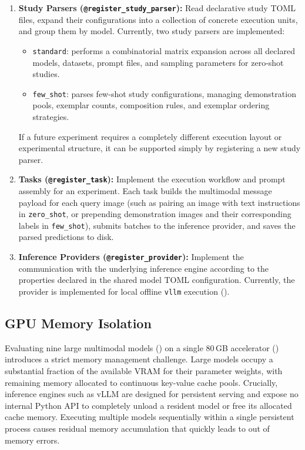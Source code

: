 \begin{enumerate}
    \item \textbf{Study Parsers (\texttt{@register\_study\_parser}):} Read declarative study TOML files, expand their configurations into a collection of concrete execution units, and group them by model. Currently, two study parsers are implemented:
    \begin{itemize}
        \item \texttt{standard}: performs a combinatorial matrix expansion across all declared models, datasets, prompt files, and sampling parameters for zero-shot studies.
        \item \texttt{few\_shot}: parses few-shot study configurations, managing demonstration pools, exemplar counts, composition rules, and exemplar ordering strategies.
    \end{itemize}
    If a future experiment requires a completely different execution layout or experimental structure, it can be supported simply by registering a new study parser.

    \item \textbf{Tasks (\texttt{@register\_task}):} Implement the execution workflow and prompt assembly for an experiment. Each task builds the multimodal message payload for each query image (such as pairing an image with text instructions in \texttt{zero\_shot}, or prepending demonstration images and their corresponding labels in \texttt{few\_shot}), submits batches to the inference provider, and saves the parsed predictions to disk.

    \item \textbf{Inference Providers (\texttt{@register\_provider}):} Implement the communication with the underlying inference engine according to the properties declared in the shared model TOML configuration. Currently, the provider is implemented for local offline \texttt{vllm} execution ().
\end{enumerate}

\subsection{GPU Memory Isolation}
\label{subsec:vram_isolation}

Evaluating nine large multimodal models () on a single 80\,GB accelerator () introduces a strict memory management challenge. Large models occupy a substantial fraction of the available VRAM for their parameter weights, with remaining memory allocated to continuous key-value cache pools. Crucially, inference engines such as vLLM are designed for persistent serving and expose no internal Python API to completely unload a resident model or free its allocated cache memory. Executing multiple models sequentially within a single persistent process causes residual memory accumulation that quickly leads to out of memory errors.


